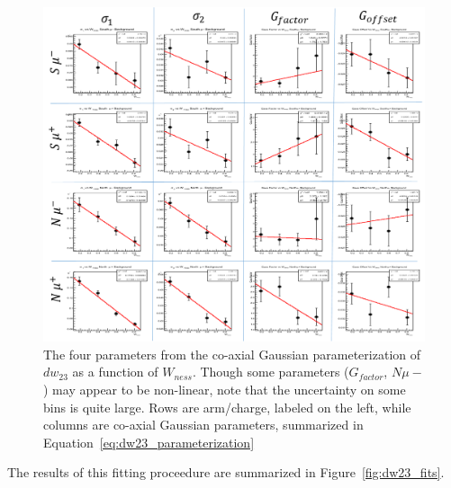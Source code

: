 \begin{figure}
  \centering
  \includegraphics[width=\linewidth]{./figures/dw23_parameters_linearized.png}
  \caption{
    The four parameters from the co-axial Gaussian parameterization of $dw_{23}$
    as a function of $W_{ness}$. Though some parameters ($G_{factor}$, $N\mu-$)
    may appear to be non-linear, note that the uncertainty on some bins is quite
    large. Rows are arm/charge, labeled on the left, while columns are co-axial
    Gaussian parameters, summarized in Equation~\ref{eq:dw23_parameterization}
  }
  \label{fig:coax_params_vs_wness}
\end{figure}

The results of this fitting proceedure are summarized in
Figure~\ref{fig:dw23_fits}.


